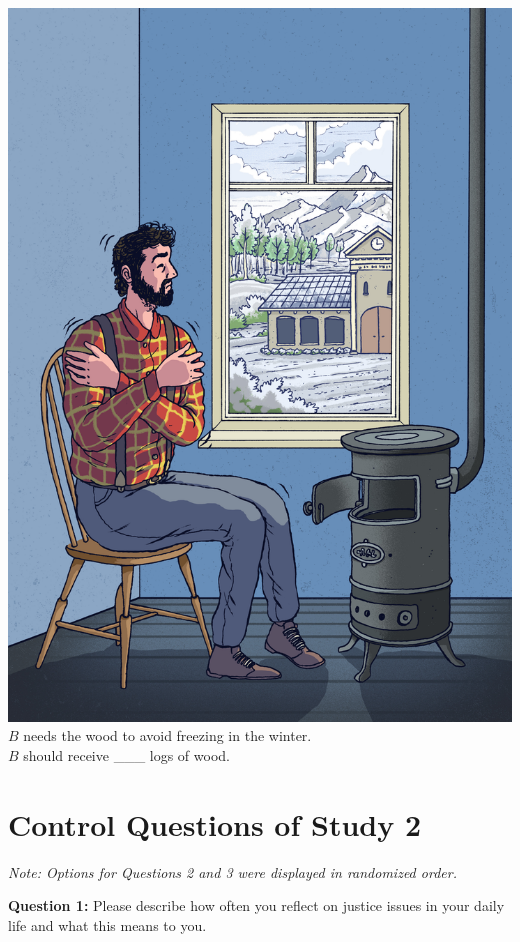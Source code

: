 \documentclass[egregdoesnotlikesansseriftitles]{scrartcl}
\begin{document}
\begin{minipage}[t]{.4\linewidth}
   \includegraphics[width=\linewidth]{figures/figure_1_b.jpg}
   $B$ needs the wood to avoid freezing in the winter.\\[5ex] $B$ should receive \_\_\_ logs of wood.
\end{minipage}


\clearpage
\section{Control Questions of Study 2}\label{sec:app_study_2_control_questions}
\noindent\textit{Note: Options for Questions 2 and 3 were displayed in randomized order.}\vspace{1ex}

\noindent\textbf{Question 1:} Please describe how often you reflect on justice issues in your daily life and what this means to you. %
\end{document}

